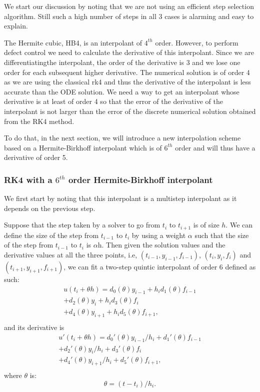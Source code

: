 \documentclass{article}
\begin{document}
We start our discussion by noting that we are not using an efficient step selection algorithm. Still such a high number of steps in all 3 cases is alarming and easy to explain.

The Hermite cubic, HB4, is an interpolant of $4^{th}$ order. However, to perform defect control we need to calculate the derivative of this interpolant. Since we are differentiatingthe interpolant, the order of the derivative is 3 and we lose one order for each subsequent higher derivative. The numerical solution is of order 4 as we are using the classical rk4 and thus the derivative of the interpolant is less accurate than the ODE solution. We need a way to get an interpolant whose derivative is at least of order 4 so that the error of the derivative of the interpolant is not larger than the error of the discrete numerical solution obtained from the RK4 method.

To do that, in the next section, we will introduce a new interpolation scheme based on a Hermite-Birkhoff interpolant which is of $6^{th}$ order and will thus have a derivative of order 5.

\subsubsection{RK4 with a $6^{th}$ order Hermite-Birkhoff interpolant}
We first start by noting that this interpolant is a multistep interpolant as it depends on the previous step.

Suppose that the step taken by a solver to go from $t_i$ to $t_{i + 1}$ is of size $h$. We can define the size of the step from $t_{i - 1}$ to $t_i$ by using a weight $\alpha$ such that the size of the step from $t_{i - 1}$ to $t_i$ is $\alpha$h. Then given the solution values and the derivative values at all the three points, i.e, $(t_{i-1}, y_{i - 1}, f_{i - 1})$, $(t_i, y_i, f_i)$ and $(t_{i + 1}, y_{i + 1}, f_{i + 1})$, we can fit a two-step quintic interpolant of order 6 defined as such:
\begin{equation}
\begin{split}
u(t_i + \theta h) = d_{0}(\theta) y_{i-1} +  h_id_{1}(\theta)f_{i-1} \\
+ d_{2}(\theta)y_i     +  h_id_{3}(\theta)f_i \\
+ d_{4}(\theta)y_{i + 1} + h_id_{5}(\theta)f_{i + 1}, \\
\end{split}
\end{equation}
and its derivative is
\begin{equation}
\begin{split}
u'(t_i + \theta h) = d_{0}'(\theta)y_{i-1}/h_i +  d_{1}'(\theta)f_{i-1} \\
+ d_{2}'(\theta)y_i/h_i     +  d_{3}'(\theta)f_i \\
+ d_{4}'(\theta)y_{i + 1}/h_i + d_{5}'(\theta)f_{i + 1}, \\
\end{split}
\end{equation}
where $\theta$ is:
\begin{equation}
\theta = (t - t_i) / h_i.
\end{equation}
\end{document}
